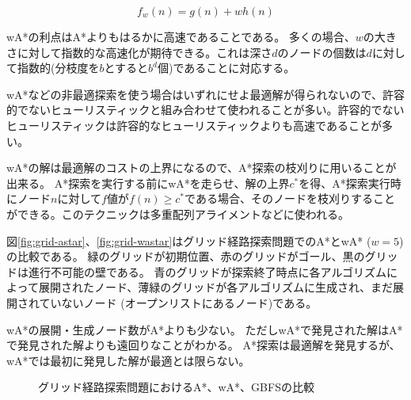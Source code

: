 \begin{equation}
	f_w(n) = g(n) + w h(n)
\end{equation}



wA*の利点はA*よりもはるかに高速であることである。
多くの場合、$w$の大きさに対して指数的な高速化が期待できる。これは深さ$d$のノードの個数は$d$に対して指数的(分枝度を$b$とすると$b^d$個)であることに対応する。

wA*などの非最適探索を使う場合はいずれにせよ最適解が得られないので、許容的でないヒューリスティックと組み合わせて使われることが多い。許容的でないヒューリスティックは許容的なヒューリスティックよりも高速であることが多い。%

wA*の解は最適解のコストの上界になるので、A*探索の枝刈りに用いることが出来る。
A*探索を実行する前にwA*を走らせ、解の上界$c^*$を得、A*探索実行時にノード$n$に対して$f$値が$f(n) \geq c^*$である場合、そのノードを枝刈りすることができる。このテクニックは多重配列アライメントなどに使われる\cite{ikeda1999enhanced}。

図\ref{fig:grid-astar}、\ref{fig:grid-wastar}はグリッド経路探索問題でのA*とwA* ($w=5$)の比較である。
緑のグリッドが初期位置、赤のグリッドがゴール、黒のグリッドは進行不可能の壁である。
青のグリッドが探索終了時点に各アルゴリズムによって展開されたノード、薄緑のグリッドが各アルゴリズムに生成され、まだ展開されていないノード (オープンリストにあるノード)である。

wA*の展開・生成ノード数がA*よりも少ない。
ただしwA*で発見された解はA*で発見された解よりも遠回りなことがわかる。
A*探索は最適解を発見するが、wA*では最初に発見した解が最適とは限らない。

\begin{figure}
  \centering
   \hspace{4pt}
   \hspace{4pt}
  \caption{グリッド経路探索問題におけるA*、wA*、GBFSの比較}
  \label{fig:grid-comparison}
\end{figure}

